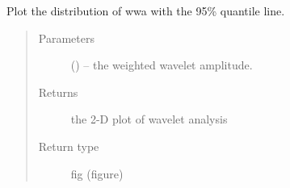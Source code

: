 \documentclass[letterpaper,10pt,english]{sphinxmanual}
\begin{document}
\begin{fulllineitems}
\label{\detokenize{Spectral:pyleoclim.Spectral.plot_wwadist}}
Plot the distribution of wwa with the 95\% quantile line.
\begin{quote}\begin{description}
\item[{Parameters}] \leavevmode
{} () -- the weighted wavelet amplitude.

\item[{Returns}] \leavevmode
the 2-D plot of wavelet analysis

\item[{Return type}] \leavevmode
fig (figure)

\end{description}\end{quote}

\end{fulllineitems}

\end{document}
